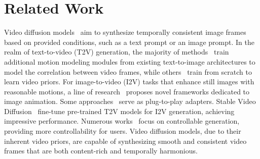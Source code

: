 
\section{Related Work}
\label{sec:related}

Video diffusion models~\citep{blattmann2023align, chen2023videocrafter1, chen2024videocrafter2, guo2023animatediff, wang2023modelscope, wang2023lavie, hong2022cogvideo, yang2024cogvideox, blattmann2023stable, zhang2024show, bu2024broadway} aim to synthesize temporally consistent image frames based on provided conditions, such as a text prompt or an image prompt. In the realm of text-to-video (T2V) generation, the majority of methods~\citep{wang2023modelscope, guo2023animatediff, chen2023videocrafter1, chen2024videocrafter2, blattmann2023align, zhang2024show} train additional motion modeling modules from existing text-to-image architectures to model the correlation between video frames, while others~\citep{hong2022cogvideo, yang2024cogvideox} train from scratch to learn video priors. For image-to-video (I2V) tasks that enhance still images with reasonable motions, a line of research~\citep {xing2025dynamicrafter, chen2025livephoto} proposes novel frameworks dedicated to image animation. Some approaches~\citep{guo2023i2v, zhang2024pia, guo2025sparsectrl} serve as plug-to-play adapters. Stable Video Diffusion~\citep{blattmann2023stable} fine-tune pre-trained T2V models for I2V generation, achieving impressive performance. Numerous works~\cite {niu2025mofa, ma2024follow,ling2024motionclone} focus on controllable generation, providing more controllability for users. Video diffusion models, due to their inherent video priors, are capable of synthesizing smooth and consistent video frames that are both content-rich and temporally harmonious.

